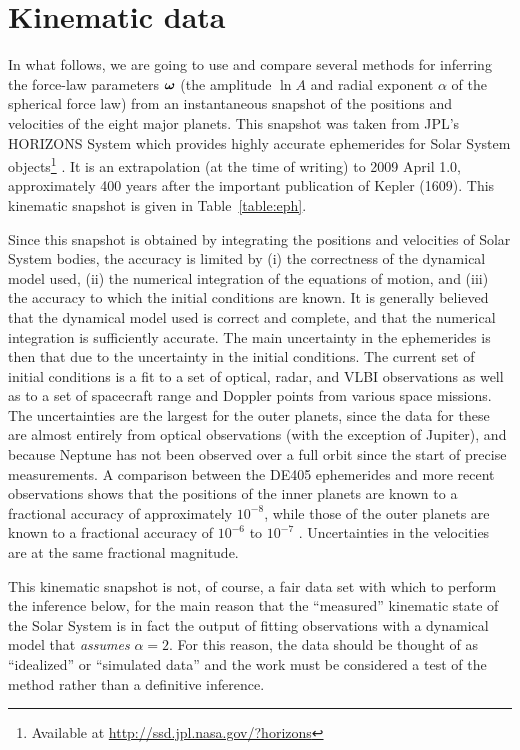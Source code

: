 \section{Kinematic data}

In what follows, we are going to use and compare several methods for
inferring the force-law parameters $\boldsymbol{{\omega}}$ (the amplitude $\ln A$
and radial exponent $\alpha$ of the spherical force law) from an
instantaneous snapshot of the positions and velocities of the eight
major planets.  This snapshot was taken from JPL's HORIZONS System
which provides highly accurate ephemerides for Solar System
objects\footnote{Available at \url{http://ssd.jpl.nasa.gov/?horizons}}
\citep{Giorgini96a}. It is an extrapolation (at the time of writing)
to 2009 April 1.0, approximately 400 years after the important
publication of Kepler (1609). This kinematic snapshot is given in
Table~\ref{table:eph}.

Since this snapshot is obtained by integrating the positions and
velocities of Solar System bodies, the accuracy is limited by (i) the
correctness of the dynamical model used, (ii) the numerical
integration of the equations of motion, and (iii) the accuracy to
which the initial conditions are known. It is generally believed that
the dynamical model used is correct and complete, and that the
numerical integration is sufficiently accurate. The main uncertainty
in the ephemerides is then that due to the uncertainty in the initial
conditions. The current set of initial conditions
\citep[DE405;][]{Standish98a} is a fit to a set of optical, radar, and
VLBI observations as well as to a set of spacecraft range and Doppler
points from various space missions. The uncertainties are the largest
for the outer planets, since the data for these are almost entirely
from optical observations (with the exception of Jupiter), and because
Neptune has not been observed over a full orbit since the start of
precise measurements. A comparison between the DE405 ephemerides and
more recent observations shows that the positions of the inner planets
are known to a fractional accuracy of approximately $10^{-8}$, while
those of the outer planets are known to a fractional accuracy of
$10^{-6}$ to $10^{-7}$ \citep{Standish04a}. Uncertainties in the
velocities are at the same fractional magnitude.

This kinematic snapshot is not, of course, a fair data set with which
to perform the inference below, for the main reason that the
``measured'' kinematic state of the Solar System is in fact the output
of fitting observations with a dynamical model that \emph{assumes}
$\alpha=2$.  For this reason, the data should be thought of as
``idealized'' or ``simulated data'' and the work must be considered a
test of the method rather than a definitive inference.

